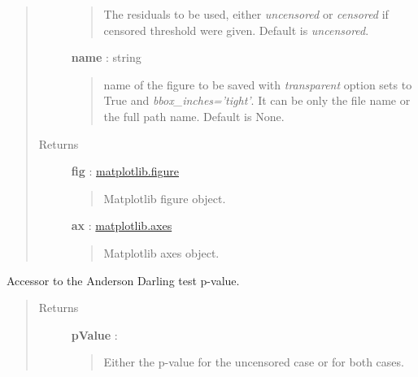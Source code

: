 \documentclass[letterpaper,10pt,english]{sphinxmanual}
\begin{document}
\begin{fulllineitems}
\begin{fulllineitems}
\begin{quote}
\begin{description}
\begin{quote}
The residuals to be used, either \emph{uncensored} or
\emph{censored} if censored threshold were given. Default is \emph{uncensored}.
\end{quote}

\textbf{name} : string
\begin{quote}

name of the figure to be saved with \emph{transparent} option sets to True
and \emph{bbox\_inches='tight'}. It can be only the file name or the 
full path name. Default is None.
\end{quote}

\item[{Returns}] \leavevmode
\textbf{fig} : \href{http://matplotlib.org/api/figure\_api.html}{matplotlib.figure}
\begin{quote}

Matplotlib figure object.
\end{quote}

\textbf{ax} : \href{http://matplotlib.org/api/axes\_api.html}{matplotlib.axes}
\begin{quote}

Matplotlib axes object.
\end{quote}

\end{description}\end{quote}

\end{fulllineitems}


\begin{fulllineitems}
\label{_generated/otpod.UnivariateLinearModelAnalysis:otpod.UnivariateLinearModelAnalysis.getAndersonDarlingPValue}
Accessor to the Anderson Darling test p-value.
\begin{quote}\begin{description}
\item[{Returns}] \leavevmode
\textbf{pValue} : \href{http://doc.openturns.org/openturns-latest/sphinx/user\_manual/\_generated/openturns.NumericalPoint.html\#openturns.NumericalPoint}{}
\begin{quote}

Either the p-value for the uncensored case or for both cases.
\end{quote}

\end{description}\end{quote}


\end{fulllineitems}
\end{fulllineitems}
\end{document}
